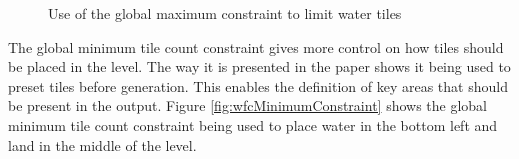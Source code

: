 \begin{figure}[H]
    \centering
    \hfill
    \caption{Use of the global maximum constraint to limit water tiles \cite{WFC_Automatic_Rules_And_Better_Symmetries}}
    \label{fig:wfcMaximumConstraint}
\end{figure}

The global minimum tile count constraint gives more control on how tiles should be placed in the level. The way it is presented in the paper shows it being used to preset tiles before generation. This enables the definition of key areas that should be present in the output. Figure \ref{fig:wfcMinimumConstraint} shows the global minimum tile count constraint being used to place water in the bottom left and land in the middle of the level.

